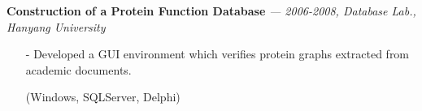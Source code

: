   \vspace{-0.15in}
  {\bf Construction of a Protein Function Database} 
    {\it \footnotesize --- 2006-2008, Database Lab., Hanyang University}
    \begin{itemize}[leftmargin=*]
    \setlength\itemsep{-0.02in}
    \item[-] Developed a GUI environment which verifies protein graphs extracted
    from academic documents.
    \item[] {\small(Windows, SQLServer, Delphi)}
    \end{itemize}

